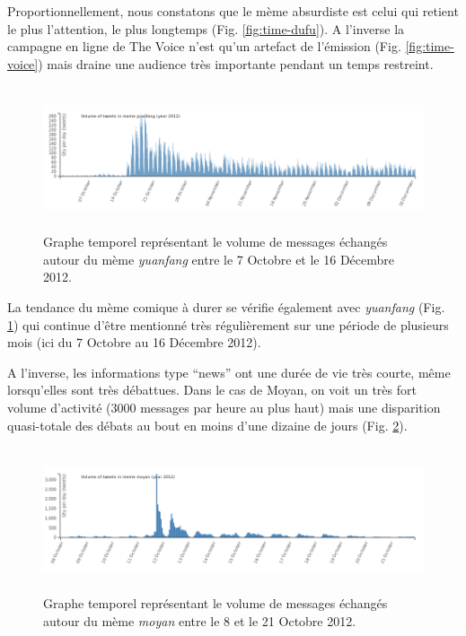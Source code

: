 Proportionnellement, nous constatons que le m\`eme absurdiste est celui
qui retient le plus l{\textquoteright}attention, le plus longtemps
(Fig. \ref{fig:time-dufu}). A l{\textquoteright}inverse la campagne en ligne de The
Voice n{\textquoteright}est qu{\textquoteright}un artefact de
l{\textquoteright}\'emission (Fig. \ref{fig:time-voice}) mais draine une audience tr\`es
importante pendant un temps restreint.


\begin{figure}[ht]
    \centering
    
  \includegraphics[width=6.0087in,height=1.6697in]{figures/chap4/chapitre4-img5.png}
  
  \caption{
   Graphe temporel repr\'esentant le volume de messages \'echang\'es  autour du m\`eme \textit{yuanfang} entre le 7 Octobre et le 16 D\'ecembre 2012.
  }
  \label{fig:time-yuanfang}
\end{figure}

La tendance du m\`eme comique \`a durer se v\'erifie \'egalement avec
\textit{yuanfang} (Fig. \ref{fig:time-yuanfang}) qui continue d{\textquoteright}\^etre mentionn\'e
tr\`es r\'eguli\`erement sur une p\'eriode de plusieurs mois (ici du 7
Octobre au 16 D\'ecembre 2012).

A l{\textquoteright}inverse, les informations type {\textquotedblleft}news{\textquotedblright} ont une dur\'ee de vie tr\`es courte, m\^eme lorsqu{\textquoteright}elles sont tr\`es d\'ebattues. Dans le cas de Moyan, on voit un tr\`es fort volume d{\textquoteright}activit\'e (3000 messages par heure au plus haut) mais une disparition quasi-totale des d\'ebats au bout en moins d{\textquoteright}une dizaine de jours (Fig. \ref{fig:time-moyan}).

\begin{figure}
    \centering
    \includegraphics[width=6.0087in,height=1.6697in]{figures/chap4/chapitre4-img6.png}
    \caption{
      Graphe temporel repr\'esentant le volume de messages \'echang\'es autour du m\`eme \textit{moyan} entre le 8 et le 21 Octobre 2012.
    }
    \label{fig:time-moyan}
\end{figure}

